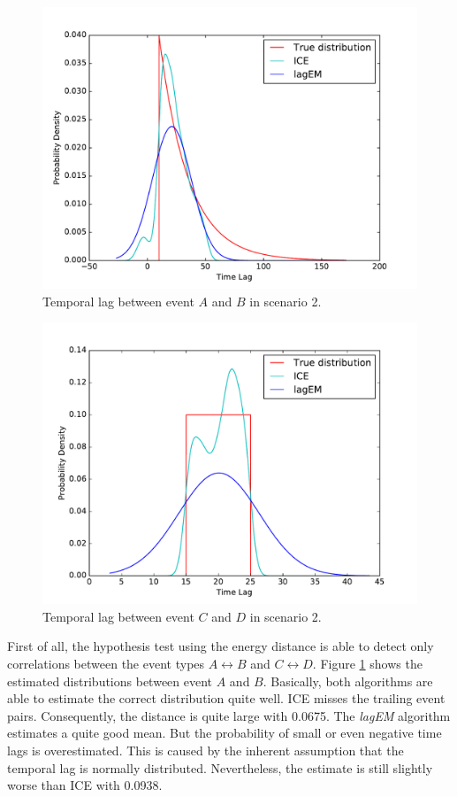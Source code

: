 \documentclass[conference]{IEEEtran}
\theoremstyle{examplestyle}
\begin{document}
\begin{figure}[!tb]
	\centering
	\includegraphics[scale=0.4]{images/scenarios/2-AB.pdf}
	\caption{Temporal lag between event \(A\) and \(B\) in scenario 2.}
	\label{fig:scen2-1}	
\end{figure}

\begin{figure}[!tb]
	\centering
	\includegraphics[scale=0.4]{images/scenarios/2-CD.pdf}
	\caption{Temporal lag between event \(C\) and \(D\) in scenario 2.}
	\label{fig:scen2-2}	
\end{figure}

First of all, the hypothesis test using the energy distance is able to detect only correlations between the event types \(A \leftrightarrow B\) and \(C \leftrightarrow D\). Figure \ref{fig:scen2-1} shows the estimated distributions between event \(A\) and \(B\). Basically, both algorithms are able to estimate the correct distribution quite well. \ac{ICE} misses the trailing event pairs. Consequently, the distance is quite large with 0.0675. The \textit{lagEM} algorithm estimates a quite good mean. But the probability of small or even negative time lags is overestimated. This is caused by the inherent assumption that the temporal lag is normally distributed. Nevertheless, the estimate is still slightly worse than \ac{ICE} with 0.0938.
\end{document}
